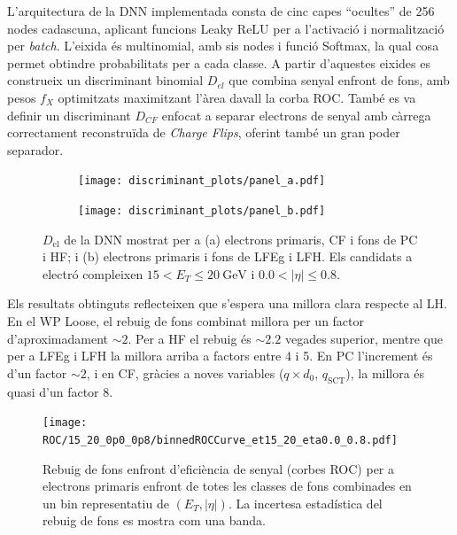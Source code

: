 L’arquitectura de la DNN implementada consta de cinc capes ``ocultes'' de 256 nodes cadascuna, aplicant funcions Leaky ReLU per a l’activació i normalització per \textit{batch}.  
L’eixida és multinomial, amb sis nodes i funció Softmax, la qual cosa permet obtindre probabilitats per a cada classe.  
A partir d’aquestes eixides es construeix un discriminant binomial $D_{el}$ que combina senyal enfront de fons, amb pesos $f_X$ optimitzats maximitzant l’àrea davall la corba ROC.  
També es va definir un discriminant $D_{CF}$ enfocat a separar electrons de senyal amb càrrega correctament reconstruïda de \textit{Charge Flips}, oferint també un gran poder separador.

\begin{figure}[htbp]
  \centering
  \begin{subfigure}[t]{0.48\linewidth}
    \centering
    \texttt{[image: discriminant\_plots/panel\_a.pdf]}
    \caption{}
    \label{res:dnnDisc_a}
  \end{subfigure}\hfill
  \begin{subfigure}[t]{0.48\linewidth}
    \centering
    \texttt{[image: discriminant\_plots/panel\_b.pdf]}
    \caption{}
    \label{res:dnnDisc_b}
  \end{subfigure}

  \caption{$D_{\mathrm{el}}$ de la DNN mostrat per a (a) electrons primaris, CF i fons de PC i HF; i (b) electrons primaris i fons de LFEg i LFH.  
  Els candidats a electró compleixen $15<E_{T}\leq 20~\mathrm{GeV}$ i $0.0<|\eta|\leq 0.8$.}
    \label{res:dnn_final_disc_ab}
\end{figure}

Els resultats obtinguts reflecteixen que s’espera una millora clara respecte al LH.  
En el WP Loose, el rebuig de fons combinat millora per un factor d’aproximadament $\sim2$.  
Per a HF el rebuig és $\sim2.2$ vegades superior, mentre que per a LFEg i LFH la millora arriba a factors entre 4 i 5.  
En PC l’increment és d’un factor $\sim2$, i en CF, gràcies a noves variables ($q\times d_0$, $q_{\text{SCT}}$), la millora és quasi d’un factor 8.

\begin{figure}[h]
  \centering
  \texttt{[image: ROC/15\_20\_0p0\_0p8/binnedROCCurve\_et15\_20\_eta0.0\_0.8.pdf]}
  \caption{Rebuig de fons enfront d’eficiència de senyal (corbes ROC) per a electrons primaris enfront de totes les classes de fons combinades en un bin representatiu de $(E_{T}, |\eta|)$.  
  La incertesa estadística del rebuig de fons es mostra com una banda.}
    \label{res:roc_allblkg}
\end{figure}


